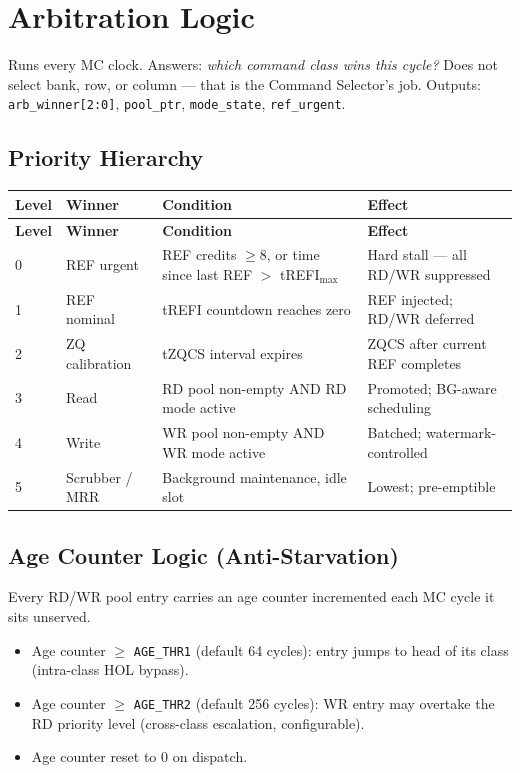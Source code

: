 \documentclass[11pt,a4paper]{article}
\newcommand{\reg}[1]{\textcolor{ddrpurple}{\texttt{#1}}}
\newcommand{\sig}[1]{\textcolor{ddrteal}{\texttt{#1}}}
\begin{document}
\section{Arbitration Logic}

Runs every MC clock. Answers: \textit{which command class wins this cycle?}
Does not select bank, row, or column --- that is the Command Selector's job.
Outputs: \sig{arb\_winner[2:0]}, \sig{pool\_ptr}, \sig{mode\_state}, \sig{ref\_urgent}.

\subsection{Priority Hierarchy}

\begin{longtable}{C{1.2cm} L{3.8cm} L{4.5cm} L{4cm}}
\toprule
\textbf{Level} & \textbf{Winner} & \textbf{Condition} & \textbf{Effect} \\
\midrule
\endfirsthead\toprule\textbf{Level}&\textbf{Winner}&\textbf{Condition}&\textbf{Effect}\\\midrule\endhead
\bottomrule\endfoot
{}
0 & REF urgent
  & REF credits $\geq 8$, or time since last REF $>$ tREFI$_{\max}$
  & Hard stall --- all RD/WR suppressed \\
1 & REF nominal
  & tREFI countdown reaches zero
  & REF injected; RD/WR deferred \\
2 & ZQ calibration
  & tZQCS interval expires
  & ZQCS after current REF completes \\
3 & Read
  & RD pool non-empty AND RD mode active
  & Promoted; BG-aware scheduling \\
4 & Write
  & WR pool non-empty AND WR mode active
  & Batched; watermark-controlled \\
5 & Scrubber / MRR
  & Background maintenance, idle slot
  & Lowest; pre-emptible \\
\end{longtable}

\subsection{Age Counter Logic (Anti-Starvation)}

Every RD/WR pool entry carries an age counter incremented each MC cycle it
sits unserved.

\begin{itemize}[leftmargin=1.5em,itemsep=2pt]
  \item Age counter $\geq$ \reg{AGE\_THR1} (default 64 cycles):
        entry jumps to head of its class (intra-class HOL bypass).
  \item Age counter $\geq$ \reg{AGE\_THR2} (default 256 cycles):
        WR entry may overtake the RD priority level (cross-class escalation,
        configurable).
  \item Age counter reset to 0 on dispatch.
\end{itemize}
\end{document}
